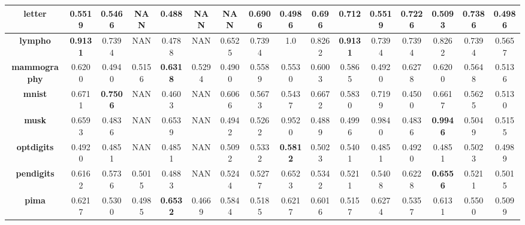\begin{table}
{\begin{tabular}{|c|c|c|c|c|c|c|c|c|c|c|c|c|c|c|c|}
	\textbf{letter}             & 0.5519          & 0.5466          & NAN             & 0.488           & NAN           & NAN             & 0.6906          & 0.4986          & 0.696        & 0.712           & 0.5519          & 0.7226          & 0.5093          & \textbf{0.7386} & 0.4986       \\ \hline
	\textbf{lympho}             & \textbf{0.9131} & 0.7394          & NAN             & 0.4788          & NAN           & 0.6525          & 0.7394          & 1.0             & 0.8262       & \textbf{0.9131} & 0.7394          & 0.7394          & 0.8262          & 0.7394          & 0.5657       \\ \hline
	\textbf{mammography}        & 0.6200          & 0.4940          & 0.5156          & \textbf{0.6318} & 0.5294        & 0.4900          & 0.5589          & 0.5530          & 0.6003       & 0.5865          & 0.4920          & 0.6278          & 0.6200          & 0.5648          & 0.5136       \\ \hline
	\textbf{mnist}              & 0.6711          & \textbf{0.7506} & NAN             & 0.4603          & NAN           & 0.6066          & 0.5673          & 0.5437          & 0.6672       & 0.5830          & 0.7199          & 0.4500          & 0.6617          & 0.5625          & 0.5130       \\ \hline
	\textbf{musk}               & 0.6593          & 0.4836          & NAN             & 0.6539          & NAN           & 0.4942          & 0.5262          & 0.9520          & 0.4889       & 0.4996          & 0.9840          & 0.4836          & \textbf{0.9946} & 0.5049          & 0.5155       \\ \hline
	\textbf{optdigits}          & 0.4920          & 0.4851          & NAN             & 0.4851          & NAN           & 0.5092          & 0.5332          & \textbf{0.5812} & 0.5023       & 0.5401          & 0.4851          & 0.4920          & 0.4851          & 0.5023          & 0.4989       \\ \hline
	\textbf{pendigits}          & 0.6162          & 0.5736          & 0.5015          & 0.4883          & NAN           & 0.5244          & 0.5277          & 0.6523          & 0.5342       & 0.5211          & 0.5408          & 0.6228          & \textbf{0.6556} & 0.5211          & 0.5015       \\ \hline
	\textbf{pima}               & 0.6217          & 0.5300          & 0.4985          & \textbf{0.6532} & 0.4669        & 0.5844          & 0.5185          & 0.6217          & 0.6016       & 0.5157          & 0.6274          & 0.5357          & 0.6131          & 0.5500          & 0.5099       \\ \hline

\end{tabular}}
\end{table}
